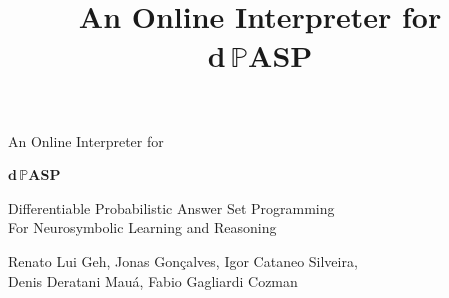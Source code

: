 \documentclass[aspectratio=169]{beamer}
\date{}
\begin{document}
\title{\rmfamily\Huge\color{black}An Online Interpreter for\\\quad\textbf{\textcolor{dpasp-purple}{$\bm{d}$}\,\textcolor{dpasp-orange}{$\pmb{\mathbb{P}}$}\textcolor{dpasp-green}{A}\textcolor{dpasp-blue}{S}\textcolor{dpasp-yellow}{P}}}

\begin{frame}
  \rmfamily\LARGE\color{black}An Online Interpreter for

  \vspace{0.25cm}

  \begin{center}
    \Huge
    \textbf{\textcolor{dpasp-purple}{$\bm{d}$}\,\textcolor{dpasp-orange}{$\pmb{\mathbb{P}}$}\textcolor{dpasp-green}{A}\textcolor{dpasp-blue}{S}\textcolor{dpasp-yellow}{P}}
  \end{center}

  \vfill

  \normalsize
  \textcolor{darker gray}{\textcolor{dpasp-blue}{D}ifferentiable
    \textcolor{dpasp-blue}{P}robabilistic \textcolor{dpasp-blue}{A}nswer
    \textcolor{dpasp-blue}{S}et \textcolor{dpasp-blue}{P}rogramming\\For Neurosymbolic Learning and
    Reasoning}

  \vfill

  \small Renato Lui Geh\textcolor{dark gray}{, Jonas Gonçalves, Igor Cataneo Silveira,\\Denis
    Deratani Mauá, Fabio Gagliardi Cozman}
\end{frame}
\end{document}

